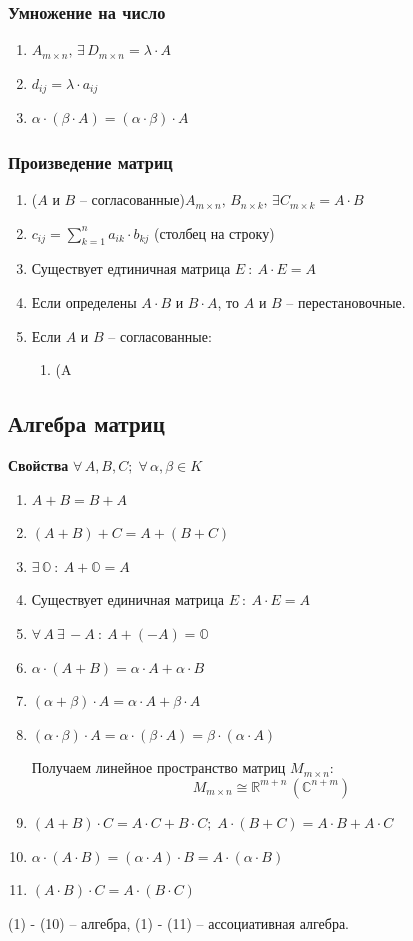 \documentclass{article}
\newcommand{\R}{\mathbb R}
\begin{document}
\subsubsection{Умножение на число}
\begin{enumerate}
    \item $A_{m\times n},\,\exists\,D_{m\times n}=\lambda\cdot A$
    \item $d_{ij}=\lambda\cdot a_{ij}$
    \item $\alpha\cdot(\beta\cdot A)=(\alpha\cdot\beta)\cdot A$
\end{enumerate}
\newpage
\subsubsection{Произведение матриц}
\begin{enumerate}
    \item ($A$ и $B$ -- согласованные)$A_{m\times n},\,B_{n\times k},\,\exists C_{m\times k}=A\cdot B$
    \item $c_{ij}=\sum\limits_{k=1}^n a_{ik}\cdot b_{kj}$ (столбец на строку)
    \item Существует едтиничная матрица $E\::\:A\cdot E=A$
    \item Если определены $A\cdot B$ и $B\cdot A$, то $A$ и $B$ -- перестановочные.
    \item Если $A$ и $B$ -- согласованные:
    \begin{enumerate}
        \item (A
    \end{enumerate}
\end{enumerate}
\subsection{Алгебра матриц}
\textbf{Свойства} $\forall\,A,B,C;\;\forall\,\alpha,\beta\in K$
\begin{enumerate}
    \item $A+B=B+A$
    \item $(A+B)+C=A+(B+C)$
    \item $\exists\,\mathbb{O}\::\:A+\mathbb{O}=A$
    \item Существует единичная матрица $E\::\:A\cdot E=A$
    \item $\forall\,A\:\exists \,-A\::\:A+(-A)=\mathbb{O}$
    \item $\alpha\cdot(A+B)=\alpha\cdot A+\alpha\cdot B$
    \item $(\alpha+\beta)\cdot A=\alpha\cdot A+\beta\cdot A$
    \item $(\alpha\cdot\beta)\cdot A=\alpha\cdot(\beta\cdot A)=\beta\cdot(\alpha\cdot A)$
    
    Получаем линейное пространство матриц $M_{m\times n}$:
    $$ M_{m\times n}\cong\R^{m+n}\,(\mathbb{C}^{n+m}) $$
    \item $(A+B)\cdot C=A\cdot C+B\cdot C;\;A\cdot
    (B+C)=A\cdot B+A\cdot C$
    \item $\alpha\cdot(A\cdot B)=(\alpha\cdot A)\cdot B=A\cdot(\alpha\cdot B)$
    \item $(A\cdot B)\cdot C=A\cdot(B\cdot C)$
\end{enumerate}
(1) - (10) -- алгебра, (1) - (11) -- ассоциативная алгебра.
\newpage
\end{document}

